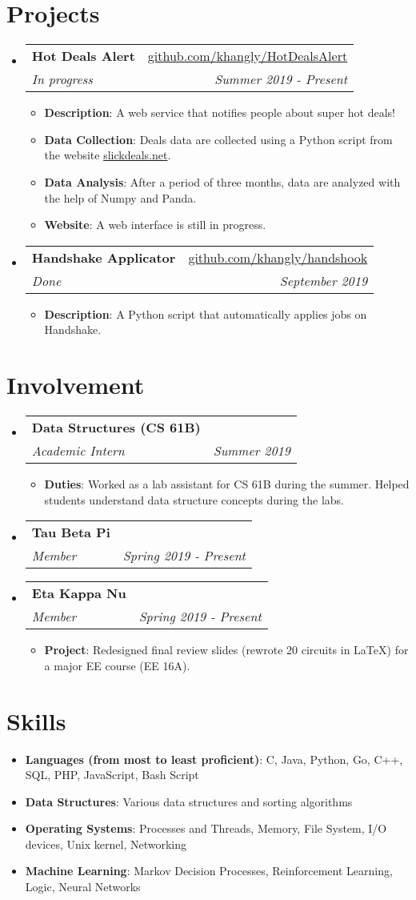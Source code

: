 \documentclass[letterpaper,11pt]{article}
\makeatletter
\newcommand{\resumeItem}[2]{
  \item\small{
    \textbf{#1}{: #2 \vspace{-2pt}}
  }
}
\newcommand{\resumeSubheading}[4]{
  \vspace{-1pt}\item
    \begin{tabular*}{0.97\textwidth}[t]{l@{\extracolsep{\fill}}r}
      \textbf{#1} & #2 \\
      \textit{\small#3} & \textit{\small #4} \\
    \end{tabular*}\vspace{-5pt}
}
\newcommand{\resumeSubItem}[2]{\resumeItem{#1}{#2}\vspace{-4pt}}
\newcommand{\resumeSubHeadingListStart}{\begin{itemize}[leftmargin=*]}
\newcommand{\resumeSubHeadingListEnd}{\end{itemize}}
\newcommand{\resumeItemListStart}{\begin{itemize}}
\newcommand{\resumeItemListEnd}{\end{itemize}\vspace{-5pt}}
\makeatother
\begin{document}
\section{Projects}
  \resumeSubHeadingListStart
    \resumeSubheading
    	{Hot Deals Alert}{\href{https://github.com/khangly/HotDealsAlert}{github.com/khangly/HotDealsAlert}}
    	{In progress}{Summer 2019 - Present}
      \resumeItemListStart
        \resumeItem{Description}
          {A web service that notifies people about super hot deals!}
        \resumeItem{Data Collection}
          {Deals data are collected using a Python script from the website \href{https://slickdeals.net}{slickdeals.net}.}
        \resumeItem{Data Analysis}
          {After a period of three months, data are analyzed with the help of Numpy and Panda.}
        \resumeItem{Website}
          {A web interface is still in progress.}
      \resumeItemListEnd
    \resumeSubheading
    	{Handshake Applicator}{\href{https://github.com/khangly/handshook}{github.com/khangly/handshook}}
    	{Done}{September 2019}
      \resumeItemListStart
        \resumeItem{Description}
          {A Python script that automatically applies jobs on Handshake.}
      \resumeItemListEnd
  \resumeSubHeadingListEnd


\section{Involvement}
  \resumeSubHeadingListStart
    \resumeSubheading
      {Data Structures (CS 61B)}{}
      {Academic Intern}{Summer 2019}
      \resumeItemListStart
        \resumeItem{Duties}
          {Worked as a lab assistant for CS 61B during the summer. Helped students understand data structure concepts during the labs.}
      \resumeItemListEnd
    \resumeSubheading
      {Tau Beta Pi}{}
      {Member}{Spring 2019 - Present}
    \resumeSubheading
      {Eta Kappa Nu}{}
      {Member}{Spring 2019 - Present}
      \resumeItemListStart
        \resumeItem{Project}
          {Redesigned final review slides (rewrote 20 circuits in LaTeX) for a major EE course (EE 16A).}
      \resumeItemListEnd
  \resumeSubHeadingListEnd


\section{Skills}
  \resumeSubHeadingListStart
    \resumeSubItem{Languages (from most to least proficient)}
    	{C, Java, Python, Go, C++, SQL, PHP, JavaScript, Bash Script}
    \resumeSubItem{Data Structures}
    	{Various data structures and sorting algorithms}
    \resumeSubItem{Operating Systems}
    	{Processes and Threads, Memory, File System, I/O devices, Unix kernel, Networking}
    \resumeSubItem{Machine Learning}
    	{Markov Decision Processes, Reinforcement Learning, Logic, Neural Networks}
  \resumeSubHeadingListEnd
\end{document}
